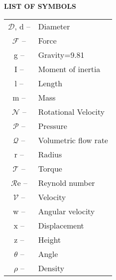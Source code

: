 	\newpage
\begin{center}
    \large \textbf{LIST OF SYMBOLS}
\end{center}
\vskip 0.45in
\renewcommand{\arraystretch}{1.4}
\begin{tabular}{cl}
    $\mathcal{D}$, d \hspace{0.7mm} -- &  Diameter   \\
    $\mathcal{F}$ \hspace{0.7mm} -- & Force  \\
    g \hspace{0.7mm} -- & Gravity=9.81   \\
    I \hspace{0.7mm} -- & Moment of inertia  \\
    l \hspace{0.7mm} -- & Length \\
    m \hspace{0.7mm} -- & Mass  \\
    $\mathcal{N}$ \hspace{0.7mm} -- & Rotational Velocity  \\
    $\mathcal{P}$ \hspace{0.7mm} -- & Pressure \\
    $\mathcal{Q}$ \hspace{0.7mm} -- & Volumetric flow rate  \\
    r \hspace{0.7mm} -- & Radius \\
    $\mathcal{T}$ \hspace{0.7mm} -- & Torque \\
    $\mathcal{R}$e \hspace{0.7mm} -- & Reynold number \\
    $\mathcal{V}$ \hspace{0.7mm} -- & Velocity  \\
    w \hspace{0.7mm} -- & Angular velocity\\
    x \hspace{0.7mm} -- & Displacement\\
    z \hspace{0.7mm} -- & Height\\
    $\theta$ \hspace{0.7mm} -- & Angle \\
    $\rho$ \hspace{0.7mm} -- & Density\\
\end{tabular}
\chapterfont{\centering \large \MakeUppercase}
\sectionfont{\small}
\subsectionfont{\small}